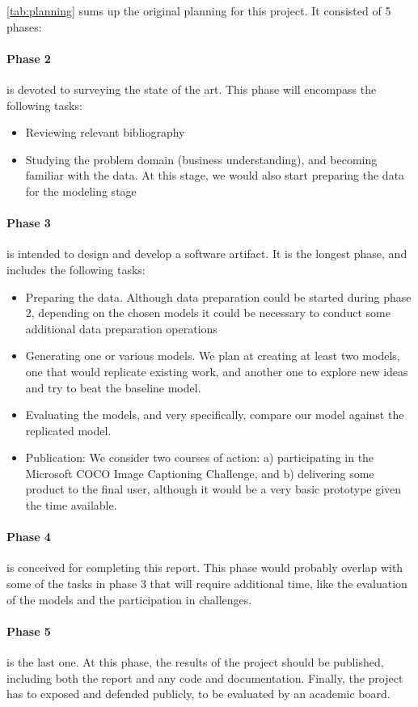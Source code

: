 \cref{tab:planning} sums up the original planning for this project. It consisted of 5 phases:

\paragraph{Phase 2} is devoted to surveying the state of the art. This phase will encompass the following tasks:
\begin{itemize}
\item Reviewing relevant bibliography
\item Studying the problem domain (business understanding), and becoming familiar with the data. At this stage, we would also start preparing the data for the modeling stage
\end{itemize}

\paragraph{Phase 3} is intended to design and develop a software artifact. It is the longest phase, and includes the following tasks:
\begin{itemize}
\item Preparing the data. Although data preparation could be started during phase 2, depending on the chosen models it could be necessary to conduct some additional data preparation operations
\item Generating one or various models. We plan at creating at least two models, one that would replicate existing work, and another one to explore new ideas and try to beat the baseline model.
\item Evaluating the models, and very specifically, compare our model against the replicated model.
\item Publication: We consider two courses of action: a) participating in the Microsoft COCO Image Captioning Challenge, and b) delivering some product to the final user, although it would be a very basic prototype given the time available.
\end{itemize}

\paragraph{Phase 4} is conceived for completing this report. This phase would probably overlap with some of the tasks in phase 3 that will require additional time, like the evaluation of the models and the participation in challenges.

\paragraph{Phase 5} is the last one. At this phase, the results of the project should be published, including both the report and any code and documentation. Finally, the project has to exposed and defended publicly, to be evaluated by an academic board.

